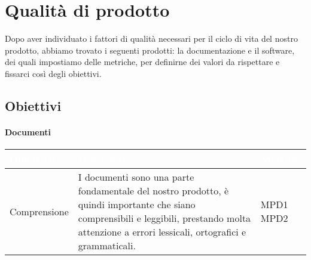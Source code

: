 \chapter{Qualità di prodotto}
Dopo aver individuato i fattori di qualità necessari per il ciclo di vita del nostro prodotto, abbiamo trovato i seguenti prodotti: la documentazione
e il software, dei quali impostiamo delle metriche, per definirne dei valori da rispettare e fissarci così degli obiettivi.
\section{Obiettivi}
\subsubsection{Documenti}

\begin{center}
  \renewcommand{\arraystretch}{1.25}
  \begin{longtable}{|p{3cm}|p{7.5cm}|p{2cm}|} \hline
  \rowcolor[HTML]{036400}
  \textcolor{white}{\textbf{Obiettivo}} & \textcolor{white}{\textbf{Descrizione}} & \textcolor{white}{\textbf{Metrica}} \\[0.2em] \hline
  \rowcolor[HTML]{EFEFEF}
    Comprensione & I documenti sono una parte fondamentale del nostro prodotto, è quindi importante che siano comprensibili e leggibili, prestando molta attenzione a errori lessicali, ortografici e grammaticali.  & MPD1 \newline MPD2       \\ \hline
  \end{longtable}
\end{center}


